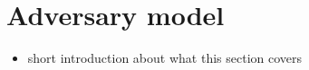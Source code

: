 \section{Adversary model} \label{sec: adversary model}

\begin{itemize}
    \item short introduction about what this section covers
\end{itemize}
